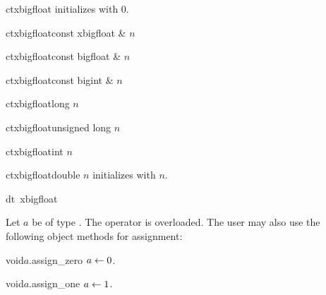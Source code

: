 
\CONS

\begin{fcode}{ct}{xbigfloat}{}
  initializes with 0.
\end{fcode}

\begin{fcode}{ct}{xbigfloat}{const xbigfloat & $n$}\end{fcode}
\begin{fcode}{ct}{xbigfloat}{const bigfloat & $n$}\end{fcode}
\begin{fcode}{ct}{xbigfloat}{const bigint & $n$}\end{fcode}
\begin{fcode}{ct}{xbigfloat}{long $n$}\end{fcode}
\begin{fcode}{ct}{xbigfloat}{unsigned long $n$}\end{fcode}
\begin{fcode}{ct}{xbigfloat}{int $n$}\end{fcode}
\begin{fcode}{ct}{xbigfloat}{double $n$}
  initializes with $n$.
\end{fcode}

\begin{fcode}{dt}{~xbigfloat}{}
\end{fcode}



\ASGN

Let $a$ be of type .  The operator \code{=} is overloaded.  The user may also
use the following object methods for assignment:

\begin{fcode}{void}{$a$.assign_zero}{}
  $a \leftarrow 0$.
\end{fcode}

\begin{fcode}{void}{$a$.assign_one}{}
  $a \leftarrow 1$.
\end{fcode}

